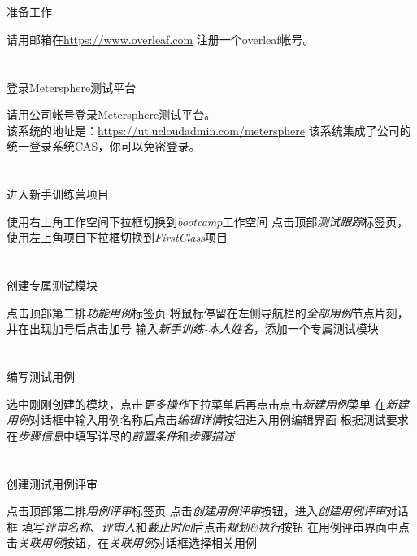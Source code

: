 \documentclass[12pt,addpoints,fleqn]{exam}
\begin{document}
\begin{questions}
\begin{parts}
  \part{}准备工作

  请用邮箱在\href{https://www.overleaf.com}{https://www.overleaf.com} 注册一个overleaf帐号。
  
  \part{}登录Metersphere测试平台

  请用公司帐号登录Metersphere测试平台。\\
  该系统的地址是：\href{https://ut.ucloudadmin.com/metersphere}{https://ut.ucloudadmin.com/metersphere}
  该系统集成了公司的统一登录系统CAS，你可以免密登录。
  
  \part{}进入新手训练营项目
  \begin{subparts}
    \subpart{}使用右上角工作空间下拉框切换到\emph{bootcamp}工作空间
    \subpart{}点击顶部\emph{测试跟踪}标签页，使用左上角项目下拉框切换到\emph{FirstClass}项目
  \end{subparts}

  \part{}创建专属测试模块
  \begin{subparts}
    \subpart{}点击顶部第二排\emph{功能用例}标签页
    \subpart{}将鼠标停留在左侧导航栏的\emph{全部用例}节点片刻，并在出现加号后点击加号
    \subpart{}输入\emph{新手训练-本人姓名}，添加一个专属测试模块
  \end{subparts}

  \part{}编写测试用例
  \begin{subparts}
    \subpart{}选中刚刚创建的模块，点击\emph{更多操作}下拉菜单后再点击点击\emph{新建用例}菜单
    \subpart{}在\emph{新建用例}对话框中输入用例名称后点击\emph{编辑详情}按钮进入用例编辑界面
    \subpart{}根据测试要求在\emph{步骤信息}中填写详尽的\emph{前置条件}和\emph{步骤描述}
  \end{subparts}

  \part{}创建测试用例评审
  \begin{subparts}
    \subpart{}点击顶部第二排\emph{用例评审}标签页
    \subpart{}点击\emph{创建用例评审}按钮，进入\emph{创建用例评审}对话框
    \subpart{}填写\emph{评审名称}、\emph{评审人}和\emph{截止时间}后点击\emph{规划\&执行}按钮
    \subpart{}在用例评审界面中点击\emph{关联用例}按钮，在\emph{关联用例}对话框选择相关用例
  \end{subparts}


\end{parts}
\end{questions}
\end{document}
